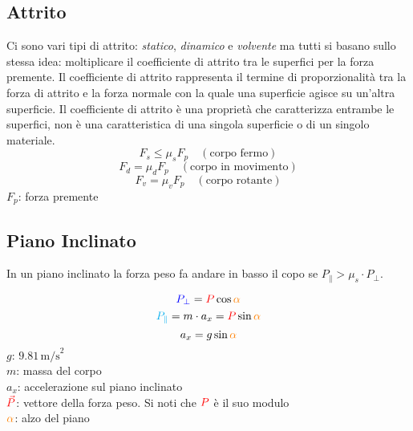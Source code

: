 \subsection{Attrito}
Ci sono vari tipi di attrito: \emph{statico}, \emph{dinamico} e \emph{volvente} ma tutti si basano
sullo stessa idea: moltiplicare il coefficiente di attrito tra le superfici per la forza premente.
Il coefficiente di attrito rappresenta il termine di proporzionalità tra la forza di attrito e la 
forza normale con la quale una superficie agisce su un’altra superficie. Il coefficiente di 
attrito è una proprietà che caratterizza entrambe le superfici, non è una caratteristica di una 
singola superficie o di un singolo materiale.
\begin{equation*}
  F_s \leq \mu_sF_p\quad (\text{corpo fermo})
\end{equation*}
\begin{equation*}
  F_d = \mu_dF_p\quad (\text{corpo in movimento})
\end{equation*}
\begin{equation*}
  F_v = \mu_vF_p\quad (\text{corpo rotante})
\end{equation*}
$F_p$: forza premente

\subsection{Piano Inclinato}
In un piano inclinato la forza peso fa andare in basso il copo se $P_\| > \mu_s\cdot P_\perp$.
\begin{center}
\end{center}
\begin{equation*}
  \mathcolor{blue}{P_\perp} = \mathcolor{red}{P}\cos\mathcolor{orange}{\alpha}
\end{equation*}
\begin{equation*}
  \mathcolor{cyan}{P_\Vert} = m\cdot a_x = \mathcolor{red}{P}\sin\mathcolor{orange}{\alpha}
\end{equation*}
\begin{equation*}
  a_x = g\sin\mathcolor{orange}{\alpha}
\end{equation*}
\hyperref[tab:g]{$g$}: $9.81\,\text{m/s}^2$\\
$m$: massa del corpo\\
$a_x$: accelerazione sul piano inclinato\\
$\mathcolor{red}{\vec{P}}$: vettore della forza peso. Si noti che $\mathcolor{red}{P}$ è il suo 
modulo\\
$\mathcolor{orange}{\alpha}$: alzo del piano

